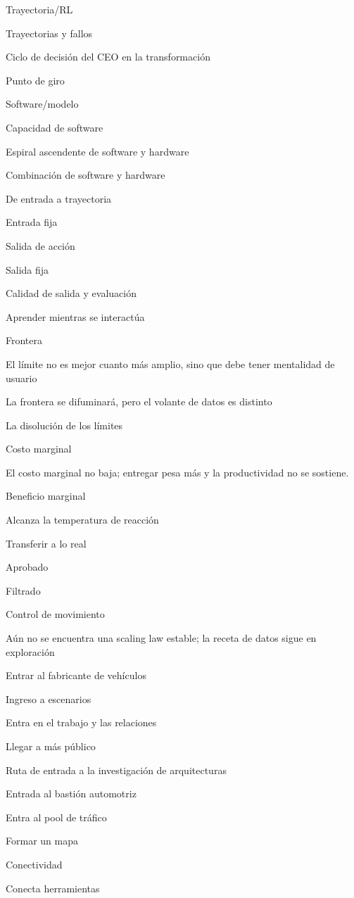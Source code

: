 \documentclass{article}
\begin{document}
Trayectoria/RL

Trayectorias y fallos

Ciclo de decisión del CEO en la transformación

Punto de giro

Software/modelo

Capacidad de software

Espiral ascendente de software y hardware

Combinación de software y hardware

De entrada a trayectoria

Entrada fija

Salida de acción

Salida fija

Calidad de salida y evaluación

Aprender mientras se interactúa

Frontera

El límite no es mejor cuanto más amplio, sino que debe tener mentalidad de usuario

La frontera se difuminará, pero el volante de datos es distinto

La disolución de los límites

Costo marginal

El costo marginal no baja; entregar pesa más y la productividad no se sostiene.

Beneficio marginal

Alcanza la temperatura de reacción

Transferir a lo real

Aprobado

Filtrado

Control de movimiento

Aún no se encuentra una scaling law estable; la receta de datos sigue en exploración

Entrar al fabricante de vehículos

Ingreso a escenarios

Entra en el trabajo y las relaciones

Llegar a más público

Ruta de entrada a la investigación de arquitecturas

Entrada al bastión automotriz

Entra al pool de tráfico

Formar un mapa

Conectividad

Conecta herramientas
\end{document}
